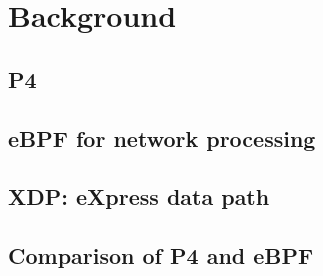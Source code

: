 \section{Background}\label{sec:bacground}

\subsection{P4}

\subsection{eBPF for network processing}

\subsection{XDP: eXpress data path}

\subsection{Comparison of P4 and eBPF}
